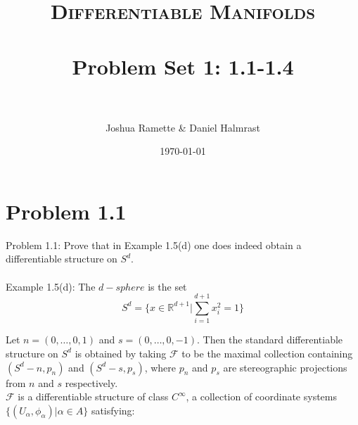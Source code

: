 \documentclass[paper=a4, fontsize=11pt]{scrartcl} %
\title{	
\normalfont \normalsize 
\textsc{Differentiable Manifolds} \\ [25pt] %
\horrule{0.5pt} \\[0.4cm] %
\huge Problem Set 1: 1.1-1.4 \\ %
\horrule{2pt} \\[0.5cm] %
}
\author{Joshua Ramette \& Daniel Halmrast} %
\date{\normalsize\today} %
\numberwithin{equation}{section} %
\numberwithin{figure}{section} %
\numberwithin{table}{section} %
\begin{document}
\maketitle %


\section*{Problem 1.1}
Problem 1.1: Prove that in Example 1.5(d) one does indeed obtain a differentiable structure on $S^d$.
\\
\\
Example 1.5(d): The $d-sphere$ is the set
\begin{equation}
S^d =\{ x \in \mathbb{R} ^{d+1} | \sum_{i=1}^{d+1} x_i ^2 = 1 \}
\end{equation}

Let $n = (0,\dots,0,1)$ and $s = (0,\dots,0,-1)$. Then the standard differentiable structure on $S^d$ is obtained by taking $\mathscr{F}$ to be the maximal collection containing $(S^d - n, p_n)$ and $(S^d - s, p_s)$, where $p_n$ and $p_s$ are stereographic projections from $n$ and $s$ respectively. 
\\

$\mathscr{F}$ is a differentiable structure of class $C^{\infty}$, a collection of coordinate systems $\{(U_{\alpha}, \phi_{\alpha}) | \alpha \in A\}$ satisfying:
\end{document}
